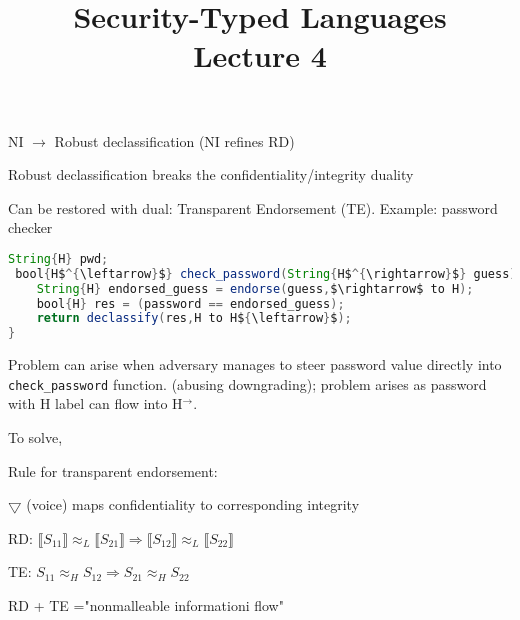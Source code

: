 \documentclass{article}
\title{Security-Typed Languages \\ \Large{Lecture 4}}
\begin{document}
\maketitle

NI $\rightarrow$ Robust declassification (NI refines RD)

Robust declassification breaks the confidentiality/integrity duality

Can be restored with dual: Transparent Endorsement (TE).
Example: password checker
\begin{lstlisting}[mathescape,frame=single,basicstyle=\ttfamily,language=java]
String{H} pwd;
 bool{H$^{\leftarrow}$} check_password(String{H$^{\rightarrow}$} guess) {
    String{H} endorsed_guess = endorse(guess,$\rightarrow$ to H);
    bool{H} res = (password == endorsed_guess);
    return declassify(res,H to H${\leftarrow}$);
}
\end{lstlisting}
Problem can arise when adversary manages to steer password value directly into \texttt{check\_password} function. (abusing downgrading); problem arises as password with H label can flow into H$^{\rightarrow}$. 

To solve,

Rule for transparent endorsement:
\begin{prooftree}
\end{prooftree}

$\bigtriangledown$ (voice) maps confidentiality to corresponding integrity



RD: $\llbracket S_{11} \rrbracket \approx_L \llbracket S_{21} \rrbracket \Rightarrow \llbracket S_{12} \rrbracket \approx_L \llbracket S_{22} \rrbracket $

TE: $S_{11} \approx_H S_{12} \Rightarrow S_{21} \approx_H S_{22} $

RD + TE ="nonmalleable informationi flow"
\end{document}
